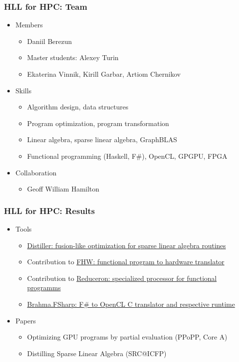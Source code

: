 \documentclass[xcolor=table,aspectratio=169]{beamer}
\begin{document}
\begin{frame}[fragile]
  \frametitle{HLL for HPC: Team}
  \begin{itemize}
    \item Members 
    \begin{itemize}
      \item Daniil Berezun
      \item Master students: Alexey Turin
      \item Ekaterina Vinnik, Kirill Garbar, Artiom Chernikov
    \end{itemize} 
    \item Skills 
    \begin{itemize}
      \item Algorithm design, data structures
      \item Program optimization, program transformation
      \item Linear algebra, sparse linear algebra, GraphBLAS
      \item Functional programming (Haskell, F\#), OpenCL, GPGPU, FPGA 
    \end{itemize}
    \item Collaboration
    \begin{itemize}
      \item Geoff William Hamilton
    \end{itemize}
  \end{itemize}
\end{frame}

\begin{frame}[fragile]
  \frametitle{HLL for HPC: Results}
    \begin{itemize}
      \item Tools
      \begin{itemize}
        \item \href{https://github.com/YaccConstructor/Distiller}{Distiller: fusion-like optimization for sparse linear algebra routines}
        \item Contribution to \href{https://github.com/sedwards-lab/fhw}{FHW: functional program to hardware translator}    
        \item Contribution to \href{https://github.com/tommythorn/Reduceron}{Reduceron: specialized processor for functional programms}    
        \item \href{https://github.com/YaccConstructor/Brahma.FSharp}{Brahma.FSharp: F\# to OpenCL C translator and respective runtime}
      \end{itemize}
      \item Papers 
      \begin{itemize}
        \item Optimizing GPU programs by partial evaluation (PPoPP, Core A)
        \item Distilling Sparse Linear Algebra (SRC@ICFP)
      \end{itemize} 
    \end{itemize}
\end{frame}
\end{document}
